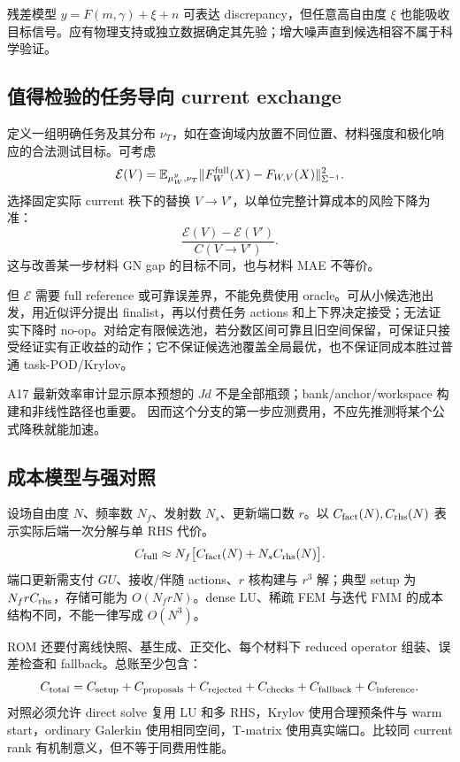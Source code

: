 残差模型 $y=F(m,\gamma)+\xi+n$ 可表达 discrepancy，但任意高自由度 $\xi$ 也能吸收目标信号。应有物理支持或独立数据确定其先验；增大噪声直到候选相容不属于科学验证。

\subsection{值得检验的任务导向 current exchange}
定义一组明确任务及其分布 $\nu_T$，如在查询域内放置不同位置、材料强度和极化响应的合法测试目标。可考虑
\[
\mathcal E(V)=
\mathbb E_{\mu_W^y,\nu_T}
\|F_W^{\rm full}(X)-F_{W,V}(X)\|_{\Sigma^{-1}}^2.
\]
选择固定实际 current 秩下的替换 $V\to V'$，以单位完整计算成本的风险下降为准：
\[
\frac{\mathcal E(V)-\mathcal E(V')}{C(V\to V')}.
\]
这与改善某一步材料 GN gap 的目标不同，也与材料 MAE 不等价。

但 $\mathcal E$ 需要 full reference 或可靠误差界，不能免费使用 oracle。可从小候选池出发，用近似评分提出 finalist，再以付费任务 actions 和上下界决定接受；无法证实下降时 no-op。对给定有限候选池，若分数区间可靠且旧空间保留，可保证只接受经证实有正收益的动作；它不保证候选池覆盖全局最优，也不保证同成本胜过普通 task-POD/Krylov。

A17 最新效率审计显示原本预想的 $Jd$ 不是全部瓶颈；bank/anchor/workspace 构建和非线性路径也重要。\cite{R_A17eff} 因而这个分支的第一步应测费用，不应先推测将某个公式降秩就能加速。

\subsection{成本模型与强对照}
设场自由度 $N$、频率数 $N_f$、发射数 $N_s$、更新端口数 $r$。以 $C_{\rm fact}(N),C_{\rm rhs}(N)$ 表示实际后端一次分解与单 RHS 代价。
\[
C_{\rm full}\approx
N_f\big[C_{\rm fact}(N)+N_sC_{\rm rhs}(N)\big].
\]
端口更新需支付 $G U$、接收/伴随 actions、$r$ 核构建与 $r^3$ 解；典型 setup 为 $N_frC_{\rm rhs}$，存储可能为 $O(N_frN)$。dense LU、稀疏 FEM 与迭代 FMM 的成本结构不同，不能一律写成 $O(N^3)$。

ROM 还要付离线快照、基生成、正交化、每个材料下 reduced operator 组装、误差检查和 fallback。总账至少包含：
\[
C_{\rm total}=C_{\rm setup}+C_{\rm proposals}+C_{\rm rejected}
+C_{\rm checks}+C_{\rm fallback}+C_{\rm inference}.
\]
对照必须允许 direct solve 复用 LU 和多 RHS，Krylov 使用合理预条件与 warm start，ordinary Galerkin 使用相同空间，T-matrix 使用真实端口。比较同 current rank 有机制意义，但不等于同费用性能。

